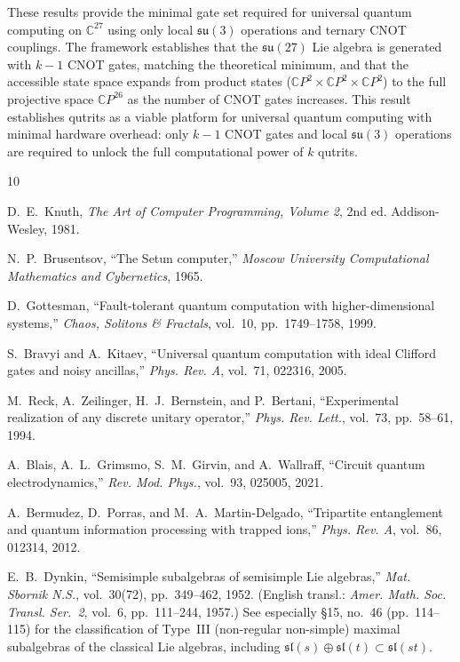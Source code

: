\documentclass[12pt,a4paper]{article}
\begin{document}
These results provide the minimal gate set required for universal quantum
computing on $\mathbb{C}^{27}$ using only local $\mathfrak{su}(3)$
operations and ternary CNOT couplings. The framework establishes that
the $\mathfrak{su}(27)$ Lie algebra is generated with $k-1$ CNOT gates,
matching the theoretical minimum, and that the accessible state space
expands from product states ($\mathbb{C}P^2 \times \mathbb{C}P^2 \times
\mathbb{C}P^2$) to the full projective space $\mathbb{C}P^{26}$ as the
number of CNOT gates increases. This result establishes qutrits as
a viable platform for universal quantum computing with minimal hardware
overhead: only $k-1$ CNOT gates and local $\mathfrak{su}(3)$ operations
are required to unlock the full computational power of $k$ qutrits.

\begin{thebibliography}{10}

D.~E.~Knuth, \emph{The Art of Computer Programming, Volume 2},
2nd ed. Addison-Wesley, 1981.

N.~P.~Brusentsov, ``The Setun computer,''
\emph{Moscow University Computational Mathematics and Cybernetics}, 1965.

D.~Gottesman, ``Fault-tolerant quantum computation with higher-dimensional
systems,''
\emph{Chaos, Solitons \& Fractals}, vol.~10, pp.~1749--1758, 1999.

S.~Bravyi and A.~Kitaev, ``Universal quantum computation with ideal
Clifford gates and noisy ancillas,''
\emph{Phys. Rev. A}, vol.~71, 022316, 2005.

M.~Reck, A.~Zeilinger, H.~J.~Bernstein, and P.~Bertani, ``Experimental
realization of any discrete unitary operator,''
\emph{Phys. Rev. Lett.}, vol.~73, pp.~58--61, 1994.

A.~Blais, A.~L.~Grimsmo, S.~M.~Girvin, and A.~Wallraff,
``Circuit quantum electrodynamics,''
\emph{Rev. Mod. Phys.}, vol.~93, 025005, 2021.

A.~Bermudez, D.~Porras, and M.~A.~Martin-Delgado, ``Tripartite
entanglement and quantum information processing with trapped ions,''
\emph{Phys. Rev. A}, vol.~86, 012314, 2012.

E.~B.~Dynkin, ``Semisimple subalgebras of semisimple Lie algebras,''
\emph{Mat. Sbornik N.S.}, vol.~30(72), pp.~349--462, 1952.
(English transl.: \emph{Amer. Math. Soc. Transl. Ser.~2}, vol.~6,
pp.~111--244, 1957.) See especially \S15, no.~46 (pp.~114--115)
for the classification of Type~III (non-regular non-simple) maximal
subalgebras of the classical Lie algebras, including
$\mathfrak{sl}(s) \oplus \mathfrak{sl}(t) \subset \mathfrak{sl}(st)$.


\end{thebibliography}
\end{document}
